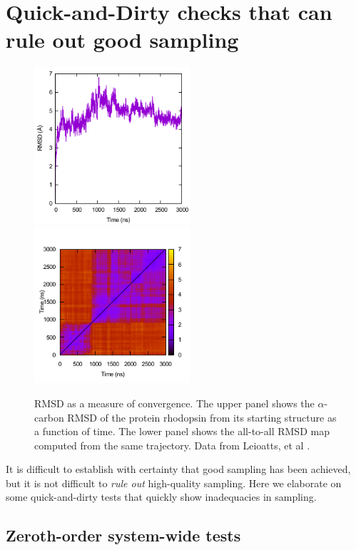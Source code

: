 
\section{Quick-and-Dirty checks that can rule out good sampling}
\label{sec:quick}

\begin{figure}
  \includegraphics[width=5.8cm]{figures/rmsd/rmsd}
  \includegraphics[width=5.8cm]{figures/rmsd/rmsds}
  \caption{
  \label{f:rmsd} RMSD as a measure of convergence.  The upper panel shows the
  $\alpha$-carbon RMSD of the protein rhodopsin from its starting structure as a
  function of time.  The lower panel shows the all-to-all RMSD map computed from the same
  trajectory.  Data from Leioatts, et al \cite{Grossfield-2015}.
  }
\end{figure}

It is difficult to establish with certainty that good sampling has been achieved, but it is not difficult to \emph{rule out} high-quality sampling.
Here we elaborate on some quick-and-dirty tests that quickly show inadequacies in sampling.

\subsection{Zeroth-order system-wide tests}

